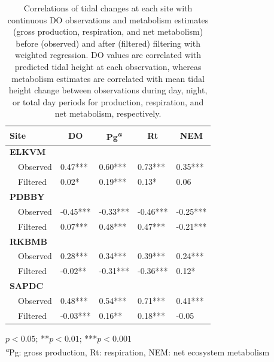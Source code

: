 \documentclass[letterpaper,12pt,oneside]{article}\usepackage[]{graphicx}\usepackage[]{color}
\begin{document}
%
\begin{table}[!tbp]
\caption{Correlations of tidal changes at each site with continuous \ac{DO} observations and metabolism estimates (gross production, respiration, and net metabolism) before (observed) and after (filtered) filtering with weighted regression.  \ac{DO} values are correlated with predicted tidal height at each observation, whereas metabolism estimates are correlated with mean tidal height change between observations during day, night, or total day periods for production, respiration, and net metabolism, respectively.\label{tab:cor_res}} 
\begin{center}
\begin{tabular}{lllll}
\hline\hline
\multicolumn{1}{l}{Site}&\multicolumn{1}{c}{DO}&\multicolumn{1}{c}{Pg\textsuperscript{\textit{a}}}&\multicolumn{1}{c}{Rt}&\multicolumn{1}{c}{NEM}\tabularnewline
\hline
{\bfseries ELKVM}&&&&\tabularnewline
~~Observed& 0.47***& 0.60***& 0.73***& 0.35***\tabularnewline
~~Filtered& 0.02*& 0.19***& 0.13*& 0.06 \tabularnewline
\hline
{\bfseries PDBBY}&&&&\tabularnewline
~~Observed&-0.45***&-0.33***&-0.46***&-0.25***\tabularnewline
~~Filtered& 0.07***& 0.48***& 0.47***&-0.21***\tabularnewline
\hline
{\bfseries RKBMB}&&&&\tabularnewline
~~Observed& 0.28***& 0.34***& 0.39***& 0.24***\tabularnewline
~~Filtered&-0.02**&-0.31***&-0.36***& 0.12*\tabularnewline
\hline
{\bfseries SAPDC}&&&&\tabularnewline
~~Observed& 0.48***& 0.54***& 0.71***& 0.41***\tabularnewline
~~Filtered&-0.03***& 0.16**& 0.18***&-0.05 \tabularnewline
\hline
\end{tabular}
\end{center}
\footnotesize *$p<0.05$; **$p<0.01$; ***$p<0.001$\\\textsuperscript{\textit{a}}Pg: gross production, Rt: respiration, NEM: net ecosystem metabolism\end{table}
\end{document}

